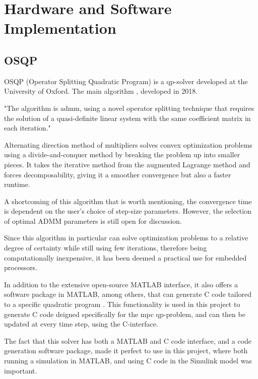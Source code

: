 
\chapter{Hardware and Software Implementation}\label{sec:methodology}


\section{OSQP}

OSQP (Operator Splitting Quadratic Program) is a \acrshort{qp}-solver developed at the University of Oxford. The main algorithm \cite{osqp}, developed in 2018.

"The algorithm is \acrfull{admm}, using a novel operator splitting technique that
requires the solution of a quasi-definite linear system with the same coefficient matrix
in each iteration." 

Alternating direction method of multipliers solves convex optimization problems using a divide-and-conquer method by breaking the problem up into smaller pieces. It takes the iterative method from the augmented Lagrange method and forces decomposability, giving it a smoother convergence but also a faster runtime.


A shortcoming of this algorithm that is worth mentioning, the convergence time is dependent on the user's choice of step-size parameters. However, the selection of optimal ADMM parameters is still open for discussion\cite{admm_param}. 

Since this algorithm in particular can solve optimization problems to a relative degree of certainty while still using few iterations, therefore being computationally inexpensive, it has been deemed a practical use for embedded processors. 


In addition to the extensive open-source MATLAB interface, it also offers a software package in MATLAB, among others, that can generate C code tailored to a specific quadratic program \cite{osqp-codegen}. This functionality is used in this project to generate C code deigned specifically for the \acrshort{mpc} \acrshort{qp}-problem, and can then be updated at every time step, using the C-interface.

The fact that this solver has both a MATLAB and C code interface, and a code generation software package, made it perfect to use in this project, where both running a simulation in MATLAB, and using  C code in the Simulink model was important. 


